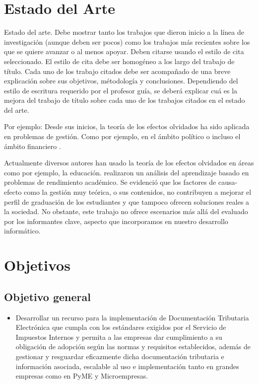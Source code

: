 \section{Estado del Arte}
Estado del arte. Debe mostrar tanto los trabajos que dieron inicio a la línea de investigación (aunque deben ser pocos) como los trabajos más recientes sobre los que se quiere avanzar o al menos apoyar. Deben citarse usando el estilo de cita seleccionado. El estilo de cita debe ser homogéneo a los largo del trabajo de título. Cada uno de los trabajo citados debe ser acompañado de una breve explicación sobre sus objetivos, métodología y conclusiones. Dependiendo del estilo de escritura requerido por el profesor guía, se deberá explicar cuá es la mejora del trabajo de título sobre cada uno de los trabajos citados en el estado del arte.

Por ejemplo: Desde sus inicios, la teoría de los efectos olvidados ha sido aplicada en problemas de gestión. Como por ejemplo, en el ámbito político \parencite[105-126]{kaufmann1988modelos} o incluso el ámbito financiero \parencite[127-151]{kaufmann1988modelos}. 

Actualmente diversos autores han usado la teoría de los efectos olvidados en áreas como por ejemplo, la educación. \textcite{cabrera2020analysis} realizaron un análisis del aprendizaje basado en problemas de rendimiento académico. Se evidenció que los factores de causa-efecto como la gestión muy teórica, o sus contenidos, no contribuyen a mejorar el perfil de graduación de los estudiantes y que tampoco ofrecen soluciones reales a la sociedad. No obstante, este trabajo no ofrece escenarios más allá del evaluado por los informantes clave, aspecto que incorporamos en nuestro desarrollo informático.  \\

\section{Objetivos}
\subsection{Objetivo general}
\begin{itemize} 
    \item Desarrollar un recurso para la implementación de Documentación Tributaria Electrónica que cumpla con los estándares exigidos por el Servicio de Impuestos Internos y permita a las empresas dar cumplimiento a su obligación de adopción según las normas y requisitos establecidos, además de gestionar y resguardar eficazmente dicha documentación tributaria e información asociada, escalable al uso e implementación tanto en grandes empresas como en PyME y Microempresas.
\end{itemize}
